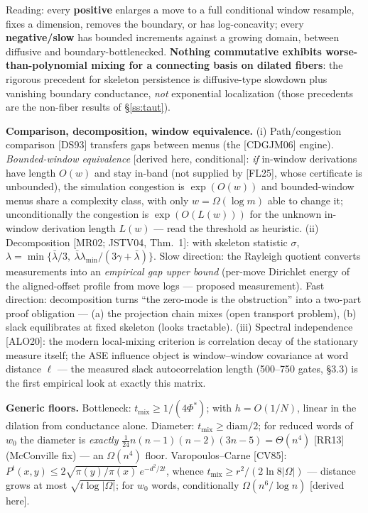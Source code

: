 \documentclass[11pt]{article}
\begin{document}
Reading: every \textbf{positive} enlarges a move to a full conditional window resample, fixes a
dimension, removes the boundary, or has log-concavity; every \textbf{negative/slow} has bounded
increments against a growing domain, between diffusive and boundary-bottlenecked. \textbf{Nothing
commutative exhibits worse-than-polynomial mixing for a connecting basis on dilated fibers}: the
rigorous precedent for skeleton persistence is diffusive-type slowdown plus vanishing boundary
conductance, \emph{not} exponential localization (those precedents are the non-fiber results of
\S\ref{ss:taut}).

\textbf{Comparison, decomposition, window equivalence.} (i) Path/congestion comparison [DS93]
transfers gaps between menus (the [CDGJM06] engine). \emph{Bounded-window equivalence}
[derived here, conditional]: \emph{if} in-window derivations have length $O(w)$ and stay in-band
(not supplied by [FL25], whose certificate is unbounded), the simulation congestion is $\exp(O(w))$
and bounded-window menus share a complexity class, with only $w=\Omega(\log m)$ able to change it;
unconditionally the congestion is $\exp(O(L(w)))$ for the unknown in-window derivation length
$L(w)$ --- read the threshold as heuristic. (ii) Decomposition [MR02; JSTV04, Thm.~1]: with skeleton statistic
$\sigma$, $\lambda = \min\{\bar\lambda/3,\ \bar\lambda\lambda_{\min}/(3\gamma+\bar\lambda)\}$. Slow
direction: the Rayleigh quotient converts measurements into an \emph{empirical gap upper bound}
(per-move Dirichlet energy of the aligned-offset profile from move logs --- proposed measurement).
Fast direction: decomposition turns ``the zero-mode is the obstruction'' into a two-part proof
obligation --- (a) the projection chain mixes (open transport problem), (b) slack equilibrates at
fixed skeleton (looks tractable). (iii) Spectral independence [ALO20]: the modern local-mixing
criterion is correlation decay of the stationary measure itself; the ASE influence object is
window--window covariance at word distance $\ell$ --- the measured slack autocorrelation length
(500--750 gates, \S3.3) is the first empirical look at exactly this matrix.

\textbf{Generic floors.} Bottleneck: $t_{\mathrm{mix}}\ge 1/(4\Phi^*)$; with $h=O(1/N)$, linear in
the dilation from conductance alone. Diameter: $t_{\mathrm{mix}}\ge\mathrm{diam}/2$; for reduced
words of $w_0$ the diameter is \emph{exactly} $\frac{1}{24}n(n-1)(n-2)(3n-5)=\Theta(n^4)$ [RR13]
(McConville fix) --- an $\Omega(n^4)$ floor. Varopoulos--Carne [CV85]:
$P^t(x,y)\le 2\sqrt{\pi(y)/\pi(x)}\,e^{-d^2/2t}$, whence $t_{\mathrm{mix}}\ge r^2/(2\ln 8|\Omega|)$
--- distance grows at most $\sqrt{t\log|\Omega|}$; for $w_0$ words, conditionally
$\Omega(n^6/\log n)$ [derived here].
\end{document}
